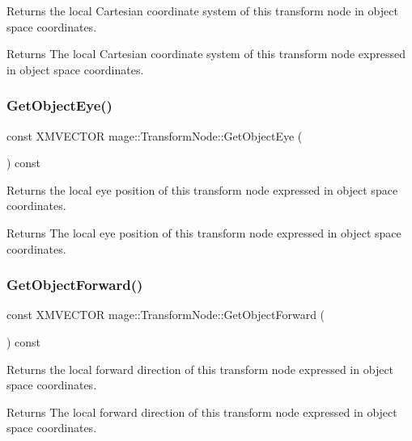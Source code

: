Returns the local Cartesian coordinate system of this transform node in object space coordinates.

\begin{DoxyReturn}{Returns}
The local Cartesian coordinate system of this transform node expressed in object space coordinates. 
\end{DoxyReturn}
\hypertarget{classmage_1_1_transform_node_a1a3a2729e417697f0e3a1bb163ed9bb7}{}\label{classmage_1_1_transform_node_a1a3a2729e417697f0e3a1bb163ed9bb7} 
\subsubsection{\texorpdfstring{Get\+Object\+Eye()}{GetObjectEye()}}
{\footnotesize\ttfamily const X\+M\+V\+E\+C\+T\+OR mage\+::\+Transform\+Node\+::\+Get\+Object\+Eye (\begin{DoxyParamCaption}{ }\end{DoxyParamCaption}) const}

Returns the local eye position of this transform node expressed in object space coordinates.

\begin{DoxyReturn}{Returns}
The local eye position of this transform node expressed in object space coordinates. 
\end{DoxyReturn}
\hypertarget{classmage_1_1_transform_node_a2f3c5ea3a0a301181b611b808842c70a}{}\label{classmage_1_1_transform_node_a2f3c5ea3a0a301181b611b808842c70a} 
\subsubsection{\texorpdfstring{Get\+Object\+Forward()}{GetObjectForward()}}
{\footnotesize\ttfamily const X\+M\+V\+E\+C\+T\+OR mage\+::\+Transform\+Node\+::\+Get\+Object\+Forward (\begin{DoxyParamCaption}{ }\end{DoxyParamCaption}) const}

Returns the local forward direction of this transform node expressed in object space coordinates.

\begin{DoxyReturn}{Returns}
The local forward direction of this transform node expressed in object space coordinates. 
\end{DoxyReturn}
\hypertarget{classmage_1_1_transform_node_aecea886df8ed9946ab2119ae365315bf}{}\label{classmage_1_1_transform_node_aecea886df8ed9946ab2119ae365315bf} 
